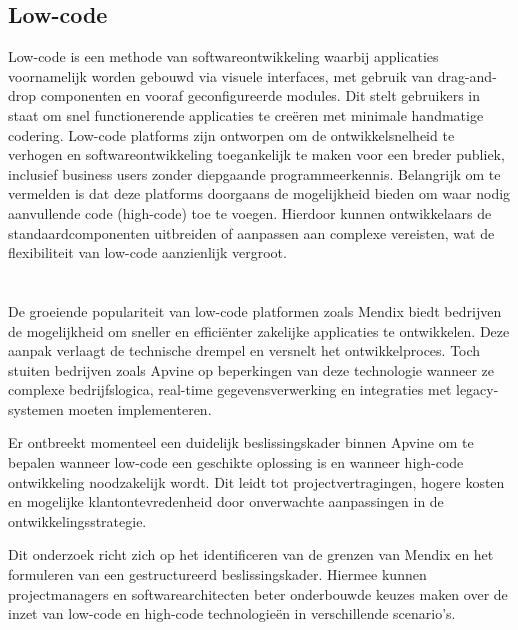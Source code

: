 \subsection{Low-code}
Low-code is een methode van softwareontwikkeling waarbij applicaties voornamelijk worden gebouwd via visuele interfaces, met gebruik van drag-and-drop componenten en vooraf geconfigureerde modules. Dit stelt gebruikers in staat om snel functionerende applicaties te creëren met minimale handmatige codering. Low-code platforms zijn ontworpen om de ontwikkelsnelheid te verhogen en softwareontwikkeling toegankelijk te maken voor een breder publiek, inclusief business users zonder diepgaande programmeerkennis. Belangrijk om te vermelden is dat deze platforms doorgaans de mogelijkheid bieden om waar nodig aanvullende code (high-code) toe te voegen. Hierdoor kunnen ontwikkelaars de standaardcomponenten uitbreiden of aanpassen aan complexe vereisten, wat de flexibiliteit van low-code aanzienlijk vergroot.


\section{}%
\label{sec:probleemstelling}

De groeiende populariteit van low-code platformen zoals Mendix biedt bedrijven de mogelijkheid om sneller en efficiënter zakelijke applicaties te ontwikkelen. Deze aanpak verlaagt de technische drempel en versnelt het ontwikkelproces. Toch stuiten bedrijven zoals Apvine op beperkingen van deze technologie wanneer ze complexe bedrijfslogica, real-time gegevensverwerking en integraties met legacy-systemen moeten implementeren.

Er ontbreekt momenteel een duidelijk beslissingskader binnen Apvine om te bepalen wanneer low-code een geschikte oplossing is en wanneer high-code ontwikkeling noodzakelijk wordt. Dit leidt tot projectvertragingen, hogere kosten en mogelijke klantontevredenheid door onverwachte aanpassingen in de ontwikkelingsstrategie.

Dit onderzoek richt zich op het identificeren van de grenzen van Mendix en het formuleren van een gestructureerd beslissingskader. Hiermee kunnen projectmanagers en softwarearchitecten beter onderbouwde keuzes maken over de inzet van low-code en high-code technologieën in verschillende scenario's.


\section{}%
\label{sec:onderzoeksvraag}

